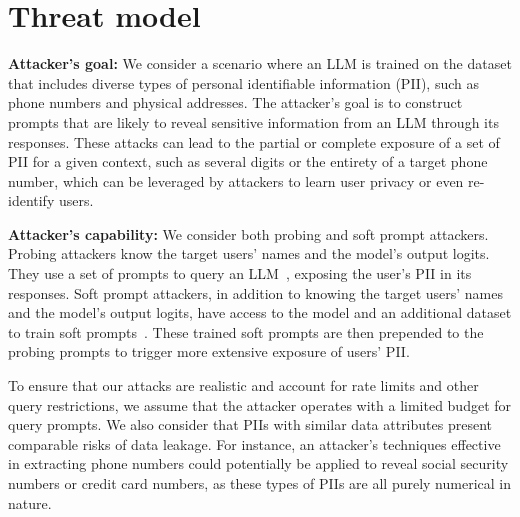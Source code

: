 \section{Threat model}

\textbf{Attacker's goal:} We consider a scenario where an LLM is trained on the dataset that includes diverse types of personal identifiable information (PII), such as phone numbers and physical addresses. 
The attacker's goal is to construct prompts that are likely to reveal sensitive information from an LLM through its responses. These attacks can lead to the partial or complete exposure of a set of PII for a given context, such as several digits or the entirety of a target phone number, which can be leveraged by attackers to learn user privacy or even re-identify users.

\textbf{Attacker's capability:} We consider both probing and soft prompt attackers. Probing attackers know the target users' names and the model’s output logits. They use a set of prompts to query an LLM~\citep{kim2024propile}, exposing the user's PII in its responses. Soft prompt attackers, in addition to knowing the target users' names and the model’s output logits, have access to the model and an additional dataset to train soft prompts~\citep{kim2024propile}. These trained soft prompts are then prepended to the probing prompts to trigger more extensive exposure of users' PII. 

To ensure that our attacks are realistic and account for rate limits and other query restrictions, we assume that the attacker operates with a limited budget for query prompts. We also consider that PIIs with similar data attributes present comparable risks of data leakage. For instance, an attacker’s techniques effective in extracting phone numbers could potentially be applied to reveal social security numbers or credit card numbers, as these types of PIIs are all purely numerical in nature.

